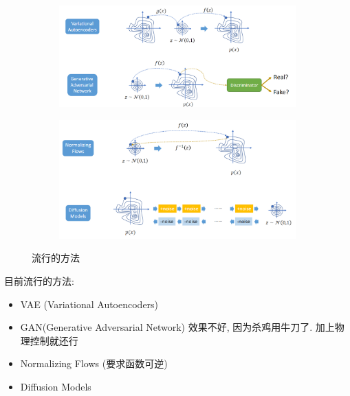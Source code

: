 \begin{figure}[!htb]
    \centering
    \begin{subfigure}{0.88\linewidth}
        \centering
        \includegraphics[width=\linewidth]{pic/1056/VAE and GAN}
    \end{subfigure}
    \begin{subfigure}{0.88\linewidth}
        \centering
        \includegraphics[width=\linewidth]{pic/1056/Normalizing Flows and Diffusion Models}
    \end{subfigure}
    \caption{流行的方法}
\end{figure}

目前流行的方法:
\begin{itemize}
    \item VAE (Variational Autoencoders)
    \item GAN(Generative Adversarial Network) 效果不好, 因为杀鸡用牛刀了. 加上物理控制就还行
    \item Normalizing Flows (要求函数可逆)
    \item Diffusion Models
\end{itemize}